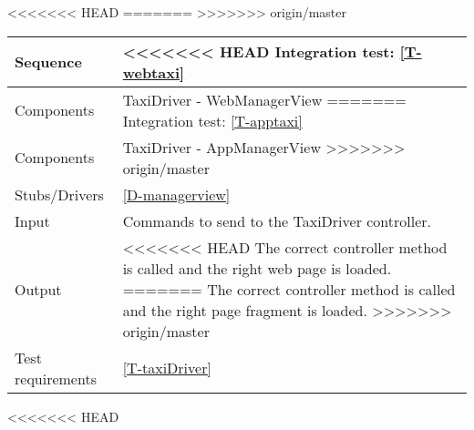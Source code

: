\begin{table}[H]
<<<<<<< HEAD
=======
>>>>>>> origin/master
    \begin{tabularx}{\textwidth}{l|X}
        \hline
        Sequence
        & 
<<<<<<< HEAD
        Integration test: \ref{T-webtaxi}
        \\ \hline
        Components 
        & 
        TaxiDriver -  WebManagerView
=======
        Integration test: \ref{T-apptaxi}
        \\ \hline
        Components 
        & 
        TaxiDriver - AppManagerView
>>>>>>> origin/master
        \\ \hline
        Stubs/Drivers 
        & 
        \ref{D-managerview}
        \\ \hline
        Input 
        & 
        Commands to send to the TaxiDriver controller.
        \\ \hline
        Output 
        & 
<<<<<<< HEAD
        The correct controller method is called and the right web page is loaded.
=======
        The correct controller method is called and the right page fragment is loaded.
>>>>>>> origin/master
        \\ \hline
        Test requirements 
        & 
        \ref{T-taxiDriver}
        \\ \hline
    \end{tabularx}
\end{table}

<<<<<<< HEAD

